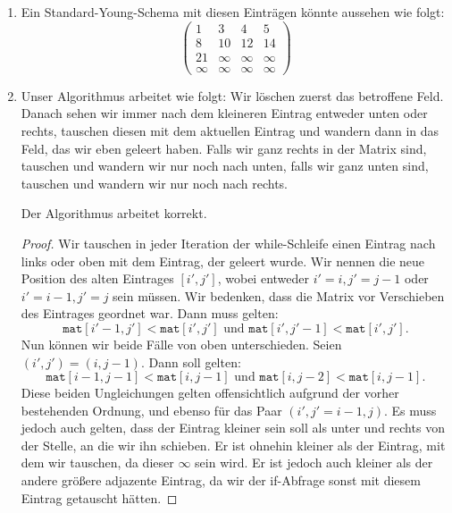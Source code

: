 \documentclass{scrartcl} %
\begin{document}
    \begin{aufgabe}
        \begin{enumerate}[label=(\alph*)]
            \item Ein Standard-Young-Schema mit diesen Einträgen könnte aussehen wie folgt:
            \[
                \begin{pmatrix}
                    1 & 3 & 4 & 5\\
                    8 & 10 & 12 & 14\\
                    21 & \infty & \infty & \infty \\
                    \infty & \infty & \infty & \infty
                \end{pmatrix}
            \]
            \item Unser Algorithmus arbeitet wie folgt: Wir löschen zuerst das betroffene Feld. Danach sehen wir immer nach dem kleineren Eintrag entweder unten oder rechts, tauschen diesen mit dem aktuellen Eintrag und wandern dann in das Feld, das wir eben geleert haben. Falls wir ganz rechts in der Matrix sind, tauschen und wandern wir nur noch nach unten, falls wir ganz unten sind, tauschen und wandern wir nur noch nach rechts.
            
            \begin{theorem*}
                Der Algorithmus arbeitet korrekt.
            \end{theorem*}
            \begin{proof}
                Wir tauschen in jeder Iteration der {\ttfamily while}-Schleife einen Eintrag nach links oder oben mit dem Eintrag, der geleert wurde. Wir nennen die neue Position des alten Eintrages $[i{'}, j{'}]$, wobei entweder $i{'} = i, j{'} = j - 1$ oder $i{'} = i - 1, j{'} = j$ sein müssen. Wir bedenken, dass die Matrix vor Verschieben des Eintrages geordnet war. Dann muss gelten:
                \[
                    \texttt{mat}[i' - 1, j'] < \texttt{mat}[i', j'] \text{ und } \texttt{mat}[i', j' - 1] < \texttt{mat}[i', j'].
                \]
                Nun können wir beide Fälle von oben unterschieden. Seien $(i', j') = (i, j - 1)$. Dann soll gelten:
                \[
                    \texttt{mat}[i - 1, j - 1] < \texttt{mat}[i, j - 1] \text{ und } \texttt{mat}[i, j - 2] < \texttt{mat}[i, j - 1].
                \]
                Diese beiden Ungleichungen gelten offensichtlich aufgrund der vorher bestehenden Ordnung, und ebenso für das Paar $(i', j' = i - 1, j)$. Es muss jedoch auch gelten, dass der Eintrag kleiner sein soll als unter und rechts von der Stelle, an die wir ihn schieben. Er ist ohnehin kleiner als der Eintrag, mit dem wir tauschen, da dieser $\infty$ sein wird. Er ist jedoch auch kleiner als der andere größere adjazente Eintrag, da wir der {\ttfamily if}-Abfrage sonst mit diesem Eintrag getauscht hätten.                

\end{proof}
\end{enumerate}
\end{aufgabe}
\end{document}

